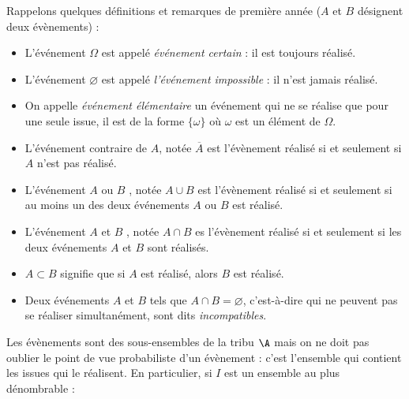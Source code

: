 \documentclass[a4paper,10pt]{report}
\begin{document}
%
%

\noindent Rappelons quelques définitions et remarques de première année ($A$ et $B$ désignent deux évènements) : 

\medskip

\begin{itemize}
  \item L'événement $\Omega$ est appelé \textit{événement certain} : il est toujours réalisé.
  \item L'événement $\varnothing$ est appelé \textit{l'événement impossible} : il n'est jamais réalisé.
  \item On appelle \textit{événement élémentaire} un événement qui ne se réalise que pour une seule issue, il est de la forme $\{\omega\}$ où $\omega$ est un élément de $\Omega$.
 \item L'événement contraire de $A$, notée $\overline{A}$ est l'évènement réalisé si et seulement si $A$ n'est pas réalisé.
  \item L'événement \og $A$ ou $B$ \fg , notée $A \cup B$ est l'évènement réalisé si et seulement si au moins un des deux événements $A$ ou $B$ est réalisé.
  \item L'événement \og $A$ et $B$ \fg , notée $A \cap B$ es l'évènement réalisé si et seulement si les deux événements $A$ et $B$ sont réalisés.
\item $A \subset B$ signifie que si $A$ est réalisé, alors $B$ est réalisé.
\item Deux événements $A$ et $B$ tels que $A \cap B=\varnothing$, c'est-à-dire qui ne peuvent pas se réaliser simultanément, sont dits \textit{incompatibles}.
\end{itemize}


\medskip

\noindent Les évènements sont des sous-ensembles de la tribu $\A$ mais on ne doit pas oublier le point de vue probabiliste d'un évènement : c'est l'ensemble qui contient les issues qui le réalisent. En particulier, si $I$ est un ensemble au plus dénombrable :
\end{document}
